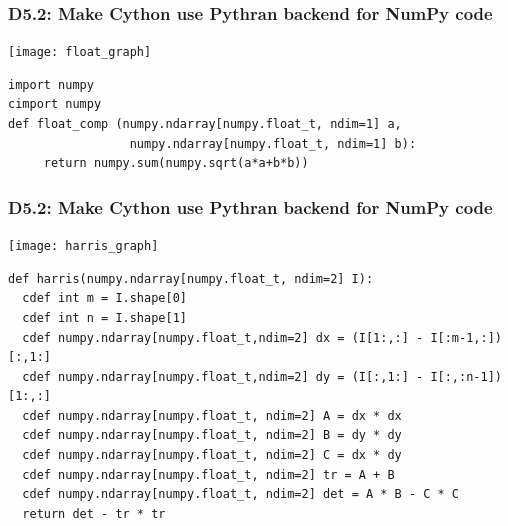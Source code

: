 \documentclass{beamer}
\begin{document}
\begin{frame}[fragile]
  \frametitle{D5.2: Make Cython use Pythran backend for NumPy code}

  \begin{center}
    \texttt{[image: float\_graph]}\\
  \end{center}
  \begin{lstlisting}
import numpy
cimport numpy
def float_comp (numpy.ndarray[numpy.float_t, ndim=1] a,
                 numpy.ndarray[numpy.float_t, ndim=1] b):
     return numpy.sum(numpy.sqrt(a*a+b*b))
\end{lstlisting}

\end{frame}
\begin{frame}[fragile]
  \frametitle{D5.2: Make Cython use Pythran backend for NumPy code}

  \begin{center}
    \texttt{[image: harris\_graph]}
  \end{center}
\vspace{-1em}
  \begin{lstlisting}[basicstyle=\tiny]
def harris(numpy.ndarray[numpy.float_t, ndim=2] I):
  cdef int m = I.shape[0]
  cdef int n = I.shape[1]
  cdef numpy.ndarray[numpy.float_t,ndim=2] dx = (I[1:,:] - I[:m-1,:])[:,1:]
  cdef numpy.ndarray[numpy.float_t,ndim=2] dy = (I[:,1:] - I[:,:n-1])[1:,:]
  cdef numpy.ndarray[numpy.float_t, ndim=2] A = dx * dx
  cdef numpy.ndarray[numpy.float_t, ndim=2] B = dy * dy
  cdef numpy.ndarray[numpy.float_t, ndim=2] C = dx * dy
  cdef numpy.ndarray[numpy.float_t, ndim=2] tr = A + B
  cdef numpy.ndarray[numpy.float_t, ndim=2] det = A * B - C * C
  return det - tr * tr
\end{lstlisting}

\end{frame}


\end{document}

